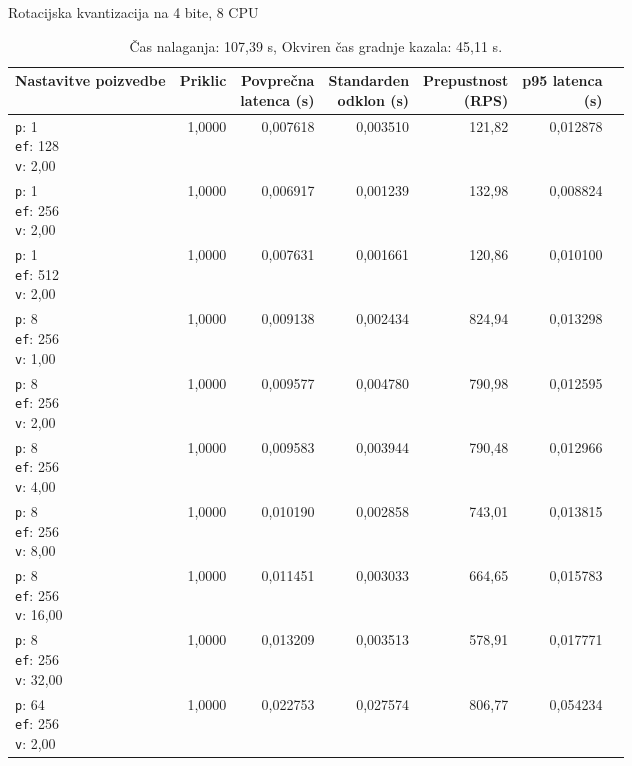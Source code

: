 \begin{table}[htbp]
  \centering
\small
  \caption{Rotacijska kvantizacija na 4 bite, 8 CPU}
  \label{tab:single-8cpu-4ram:tq4:qdrant-dipl-baseline-tenant-subgraph-tq4-ext-m16-ef-128-random-768-100-tenants-extended-upload-2026-08-20-00-13-41.json}
  \begin{tabularx}{\textwidth}{Xrrrrrr}
    \toprule
    Nastavitve poizvedbe & Priklic & \makecell{Povprečna\\latenca (s)} & \makecell{Standarden\\odklon (s)} & \makecell{Prepustnost\\(RPS)} & \makecell{p95 latenca\\(s)}  \\
    \midrule
    \makecell{\texttt{p}: 1\\\texttt{ef}: 128\\\texttt{v}: 2,00} & 1,0000 & 0,007618 & 0,003510 & 121,82 & 0,012878 \\
    \makecell{\texttt{p}: 1\\\texttt{ef}: 256\\\texttt{v}: 2,00} & 1,0000 & 0,006917 & 0,001239 & 132,98 & 0,008824 \\
    \makecell{\texttt{p}: 1\\\texttt{ef}: 512\\\texttt{v}: 2,00} & 1,0000 & 0,007631 & 0,001661 & 120,86 & 0,010100 \\
    \makecell{\texttt{p}: 8\\\texttt{ef}: 256\\\texttt{v}: 1,00} & 1,0000 & 0,009138 & 0,002434 & 824,94 & 0,013298 \\
    \makecell{\texttt{p}: 8\\\texttt{ef}: 256\\\texttt{v}: 2,00} & 1,0000 & 0,009577 & 0,004780 & 790,98 & 0,012595 \\
    \makecell{\texttt{p}: 8\\\texttt{ef}: 256\\\texttt{v}: 4,00} & 1,0000 & 0,009583 & 0,003944 & 790,48 & 0,012966 \\
    \makecell{\texttt{p}: 8\\\texttt{ef}: 256\\\texttt{v}: 8,00} & 1,0000 & 0,010190 & 0,002858 & 743,01 & 0,013815 \\
    \makecell{\texttt{p}: 8\\\texttt{ef}: 256\\\texttt{v}: 16,00} & 1,0000 & 0,011451 & 0,003033 & 664,65 & 0,015783 \\
    \makecell{\texttt{p}: 8\\\texttt{ef}: 256\\\texttt{v}: 32,00} & 1,0000 & 0,013209 & 0,003513 & 578,91 & 0,017771 \\
    \makecell{\texttt{p}: 64\\\texttt{ef}: 256\\\texttt{v}: 2,00} & 1,0000 & 0,022753 & 0,027574 & 806,77 & 0,054234 \\
    \bottomrule
  \end{tabularx}
\caption* {Čas nalaganja: 107,39 s, Okviren čas gradnje kazala: 45,11 s.}\end{table}
